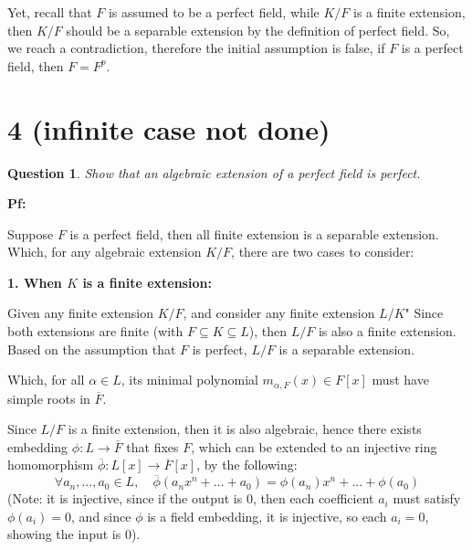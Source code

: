 \documentclass{article}
\newtheorem{question}{Question}
\begin{document}
Yet, recall that $F$ is assumed to be a perfect field, while $K/F$ is a finite extension, then $K/F$ should be a separable extension by the definition of perfect field. So, we reach a contradiction, therefore the initial assumption is false, if $F$ is a perfect field, then $F=F^p$.

\break

\section*{4 (infinite case not done)}
\begin{myBox}[]{}
    \begin{question}
        Show that an algebraic extension of a perfect field is perfect.
    \end{question}
\end{myBox}

\textbf{Pf:}

Suppose $F$ is a perfect field, then all finite extension is a separable extension. Which, for any algebraic extension $K/F$, there are two cases to consider:

\hfil

\textbf{1. When $K$ is a finite extension:}

Given any finite extension $K/F$, and consider any finite extension $L/K$" Since both extensions are finite (with $F\subseteq K\subseteq L$), then $L/F$ is also a finite extension. Based on the assumption that $F$ is perfect, $L/F$ is a separable extension.

Which, for all $\alpha\in L$, its minimal polynomial $m_{\alpha,F}(x)\in F[x]$ must have simple roots in $\overline{F}$.

\hfil

Since $L/F$ is a finite extension, then it is also algebraic, hence there exists embedding $\phi:L\rightarrow\overline{F}$ that fixes $F$, which can be extended to an injective ring homomorphism $\overline{\phi}:L[x]\rightarrow\overline{F}[x]$, by the following:
$$\forall a_n,...,a_0\in L,\quad \overline{\phi}(a_nx^n+...+a_0)=\phi(a_n)x^n+...+\phi(a_0)$$
(Note: it is injective, since if the output is $0$, then each coefficient $a_i$ must satisfy $\phi(a_i)=0$, and since $\phi$ is a field embedding, it is injective, so each $a_i=0$, showing the input is $0$).
\end{document}
